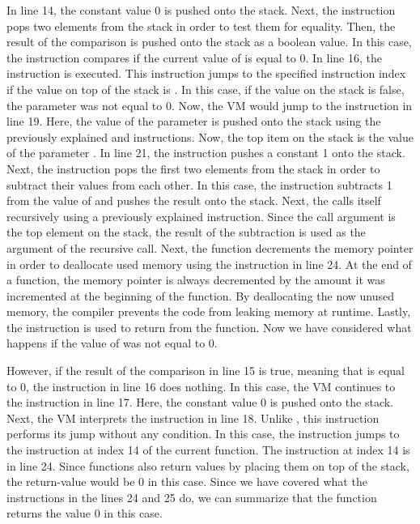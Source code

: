 In line 14, the constant value 0 is pushed onto the stack.
Next, the  instruction pops two elements from the stack in order to test them for equality.
Then, the result of the comparison is pushed onto the stack as a boolean value.
In this case, the instruction compares if the current value of  is equal to 0.
In line 16, the  instruction is executed.
This instruction jumps to the specified instruction index if the value on top of the stack is .
In this case, if the value on the stack is false, the parameter  was not equal to 0.
Now, the VM would jump to the instruction in line 19.
Here, the value of the parameter  is pushed onto the stack using the previously explained  and  instructions.
Now, the top item on the stack is the value of the parameter .
In line 21, the  instruction pushes a constant 1 onto the stack.
Next, the  instruction pops the first two elements from the stack in order to subtract their values from each other.
In this case, the instruction subtracts 1 from the value of  and pushes the result onto the stack.
Next, the  calls itself recursively using a previously explained  instruction.
Since the call argument is the top element on the stack, the result of the subtraction is used as the argument of the recursive call.
Next, the function decrements the memory pointer in order to deallocate used memory using the  instruction in line 24.
At the end of a function, the memory pointer is always decremented by the amount it was incremented at the beginning of the function.
By deallocating the now unused memory, the compiler prevents the code from leaking memory at runtime.
Lastly, the  instruction is used to return from the function.
Now we have considered what happens if the value of  was not equal to 0.

However, if the result of the comparison in line 15 is true, meaning that  is equal to 0, the  instruction in line 16 does nothing.
In this case, the VM continues to the  instruction in line 17.
Here, the constant value 0 is pushed onto the stack.
Next, the VM interprets the  instruction in line 18.
Unlike , this instruction performs its jump without any condition.
In this case, the instruction jumps to the instruction at index 14 of the current function.
The instruction at index 14 is  in line 24.
Since functions also return values by placing them on top of the stack, the return-value would be 0 in this case.
Since we have covered what the instructions in the lines 24 and 25 do, we can summarize that the function returns the value 0 in this case.

